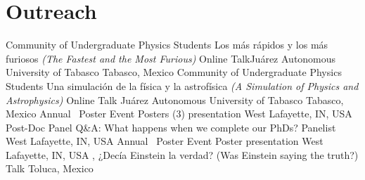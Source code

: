 \section{Outreach}

%
{Community of Undergraduate Physics Students}%
{Los más rápidos y los más furiosos \textnormal{\textit{(The Fastest and the Most Furious)}}}%
{Online Talk}{Juárez Autonomous University of Tabasco}%
{Tabasco, Mexico}
%
{Community of Undergraduate Physics Students}%
{Una simulación de la física y la astrofísica \textnormal{\textit{(A Simulation of Physics and Astrophysics)}}}%
{Online Talk}%
{Juárez Autonomous University of Tabasco}%
{Tabasco, Mexico}
%
{\DPA}%
{Annual \DPA\ Poster Event}%
{Posters (3) presentation}%
{\Purdue}%
{West Lafayette, IN, USA}
%
{\DPA}%
{Post-Doc Panel Q\&A: What happens when we complete our PhDs?}%
{Panelist}%
{\Purdue}%
{West Lafayette, IN, USA}
%
{\DPA}%
{Annual \DPA\ Poster Event}%
{Poster presentation}%
{\Purdue}%
{West Lafayette, IN, USA}
%
{\FCes, \UAEMes}%
{¿Decía Einstein la verdad? (Was Einstein saying the truth?)}%
{Talk}%
{}%
{Toluca, Mexico}

